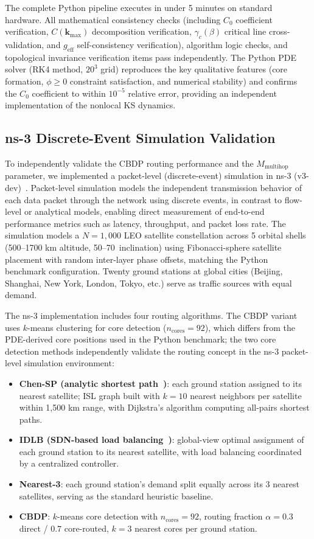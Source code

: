 \documentclass[sn-nature,pdflatex]{sn-jnl}
\begin{document}
The complete Python pipeline executes in under 5 minutes on standard hardware. All mathematical consistency checks (including $C_0$ coefficient verification, $C(\mathbf{k}_{\max})$ decomposition verification, $\gamma_c(\beta)$ critical line cross-validation, and $g_{\text{eff}}$ self-consistency verification), algorithm logic checks, and topological invariance verification items pass independently. The Python PDE solver (RK4 method, $20^3$ grid) reproduces the key qualitative features (core formation, $\phi \ge 0$ constraint satisfaction, and numerical stability) and confirms the $C_0$ coefficient to within $10^{-5}$ relative error, providing an independent implementation of the nonlocal KS dynamics.

\subsection{ns-3 Discrete-Event Simulation Validation}

To independently validate the CBDP routing performance and the $M_{\text{multihop}}$ parameter, we implemented a packet-level (discrete-event) simulation in ns-3 (v3-dev)~\cite{ns3_manual}. Packet-level simulation models the independent transmission behavior of each data packet through the network using discrete events, in contrast to flow-level or analytical models, enabling direct measurement of end-to-end performance metrics such as latency, throughput, and packet loss rate.
The simulation models a $N=1,000$ LEO satellite constellation across 5 orbital shells (500--1700 km altitude, 50--70\degree\ inclination) using Fibonacci-sphere satellite placement with random inter-layer phase offsets, matching the Python benchmark configuration.
Twenty ground stations at global cities (Beijing, Shanghai, New York, London, Tokyo, etc.) serve as traffic sources with equal demand.

The ns-3 implementation includes four routing algorithms. The CBDP variant uses $k$-means clustering for core detection ($n_{\text{cores}}=92$), which differs from the PDE-derived core positions used in the Python benchmark; the two core detection methods independently validate the routing concept in the ns-3 packet-level simulation environment:
\begin{itemize}
  \item \textbf{Chen-SP (analytic shortest path~\cite{chen_2024_jsac})}: each ground station assigned to its nearest satellite; ISL graph built with $k=10$ nearest neighbors per satellite within 1,500 km range, with Dijkstra's algorithm computing all-pairs shortest paths.
  \item \textbf{IDLB (SDN-based load balancing~\cite{roth_2025_idlb})}: global-view optimal assignment of each ground station to its nearest satellite, with load balancing coordinated by a centralized controller.
  \item \textbf{Nearest-3}: each ground station's demand split equally across its 3 nearest satellites, serving as the standard heuristic baseline.
  \item \textbf{CBDP}: $k$-means core detection with $n_{\text{cores}}=92$, routing fraction $\alpha=0.3$ direct / $0.7$ core-routed, $k=3$ nearest cores per ground station.
\end{itemize}
\end{document}
